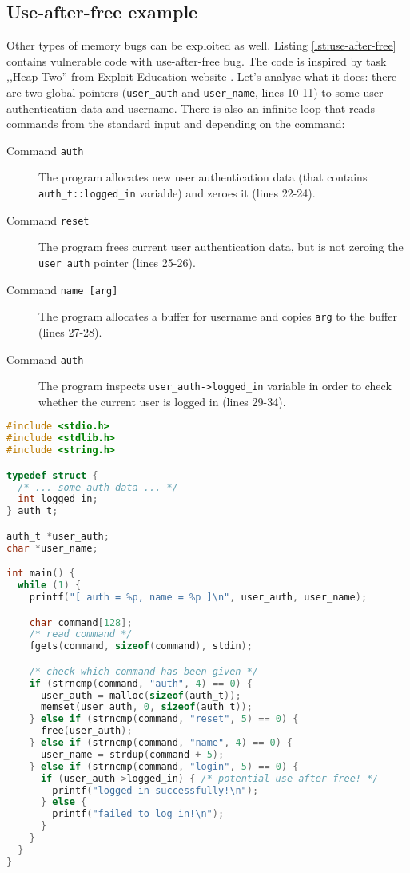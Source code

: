 \documentclass[shortabstract, manyadvisors, english, mgr]{iithesis}
\theoremstyle{definition} \newtheorem*{definition}{Definicja}
\theoremstyle{definition} \newtheorem*{example}{Przykład}
\theoremstyle{definition} \newtheorem*{remark}{Uwaga}
\begin{document}
\subsection{Use-after-free example}
Other types of memory bugs can be exploited as well. Listing \ref{lst:use-after-free} contains vulnerable code with use-after-free bug. The code is inspired by task ,,Heap Two'' from Exploit Education website \cite{bib:protostar-bib2}. Let's analyse what it does: there are two global pointers (\texttt{user\_auth} and \texttt{user\_name}, lines 10-11) to some user authentication data and username. There is also an infinite loop that reads commands from the standard input and depending on the command:
\begin{description}
    \item[Command \texttt{auth}] The program allocates new user authentication data (that contains \texttt{auth\_t::logged\_in} variable) and zeroes it (lines 22-24).
    \item[Command \texttt{reset}] The program frees current user authentication data, but is not zeroing the \texttt{user\_auth} pointer (lines 25-26).
    \item[Command \texttt{name {[}arg{]}}] The program allocates a buffer for username and copies \texttt{arg} to the buffer (lines 27-28).
    \item[Command \texttt{auth}] The program inspects \texttt{user\_auth->logged\_in} variable in order to check whether the current user is logged in (lines 29-34).
\end{description}
\begin{lstlisting}[language=C, caption=A code containing use-after-free bug., label={lst:use-after-free}]
#include <stdio.h>
#include <stdlib.h>
#include <string.h>

typedef struct {
  /* ... some auth data ... */
  int logged_in;
} auth_t;

auth_t *user_auth;
char *user_name;

int main() {
  while (1) {
    printf("[ auth = %p, name = %p ]\n", user_auth, user_name);

    char command[128];
    /* read command */
    fgets(command, sizeof(command), stdin);

    /* check which command has been given */
    if (strncmp(command, "auth", 4) == 0) {
      user_auth = malloc(sizeof(auth_t));
      memset(user_auth, 0, sizeof(auth_t));
    } else if (strncmp(command, "reset", 5) == 0) {
      free(user_auth);
    } else if (strncmp(command, "name", 4) == 0) {
      user_name = strdup(command + 5);
    } else if (strncmp(command, "login", 5) == 0) {
      if (user_auth->logged_in) { /* potential use-after-free! */
        printf("logged in successfully!\n");
      } else {
        printf("failed to log in!\n");
      }
    }
  }
}
\end{lstlisting}
\end{document}
